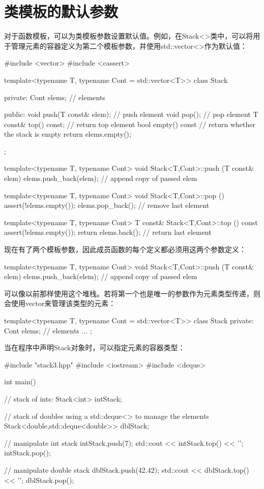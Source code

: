 \section{类模板的默认参数}

对于函数模板，可以为类模板参数设置默认值。例如，在Stack<>类中，可以将用于管理元素的容器定义为第二个模板参数，并使用std::vector<>作为默认值：

\begin{cpp}
#include <vector>
#include <cassert>

template<typename T, typename Cont = std::vector<T>>
class Stack {
private:
	Cont elems; // elements
	
public:
	void push(T const& elem); // push element
	void pop(); // pop element
	T const& top() const; // return top element
	bool empty() const { // return whether the stack is empty
		return elems.empty();
	}
};

template<typename T, typename Cont>
void Stack<T,Cont>::push (T const& elem) {
	elems.push_back(elem); // append copy of passed elem
}

template<typename T, typename Cont>
void Stack<T,Cont>::pop () {
	assert(!elems.empty());
	elems.pop_back(); // remove last element
}

template<typename T, typename Cont>
T const& Stack<T,Cont>::top () const {
	assert(!elems.empty());
	return elems.back(); // return last element
}
\end{cpp}

现在有了两个模板参数，因此成员函数的每个定义都必须用这两个参数定义：

\begin{cpp}
template<typename T, typename Cont>
void Stack<T,Cont>::push (T const& elem) {
	elems.push_back(elem); // append copy of passed elem
}
\end{cpp}

可以像以前那样使用这个堆栈。若将第一个也是唯一的参数作为元素类型传递，则会使用vector来管理该类型的元素：

\begin{cpp}
template<typename T, typename Cont = std::vector<T>>
class Stack {
private:
	Cont elems; // elements
	...
};
\end{cpp}

当在程序中声明Stack对象时，可以指定元素的容器类型：

\begin{cpp}
#include "stack3.hpp"
#include <iostream>
#include <deque>

int main() {
	// stack of ints:
	Stack<int> intStack;

	// stack of doubles using a std::deque<> to manage the elements
	Stack<double,std::deque<double>> dblStack;

	// manipulate int stack
	intStack.push(7);
	std::cout << intStack.top() << '\n';
	intStack.pop();

	// manipulate double stack
	dblStack.push(42.42);
	std::cout << dblStack.top() << '\n';
	dblStack.pop();
}
\end{cpp}

